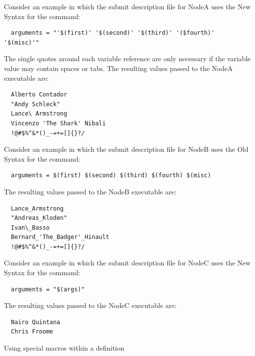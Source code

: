 Consider an example in which
the submit description file for NodeA uses the New Syntax for the
 command:
\footnotesize
\begin{verbatim}
  arguments = "'$(first)' '$(second)' '$(third)' '($fourth)' '$(misc)'"
\end{verbatim}
\normalsize
The single quotes around each variable reference are only necessary
if the variable value may contain spaces or tabs.
The resulting values passed to the NodeA executable are:
\footnotesize
\begin{verbatim}
  Alberto Contador
  "Andy	Schleck"
  Lance\ Armstrong
  Vincenzo 'The Shark' Nibali
  !@#$%^&*()_-=+=[]{}?/
\end{verbatim}
\normalsize

Consider an example in which
the submit description file for NodeB uses the Old Syntax for the
 command:
\footnotesize
\begin{verbatim}
  arguments = $(first) $(second) $(third) $(fourth) $(misc)
\end{verbatim}
\normalsize

The resulting values passed to the NodeB executable are:
\footnotesize
\begin{verbatim}
  Lance_Armstrong
  "Andreas_Kloden"
  Ivan\_Basso
  Bernard_'The_Badger'_Hinault
  !@#$%^&*()_-=+=[]{}?/
\end{verbatim}
\normalsize

Consider an example in which
the submit description file for NodeC uses the New Syntax for the
 command:
\footnotesize
\begin{verbatim}
  arguments = "$(args)"
\end{verbatim}
\normalsize

The resulting values passed to the NodeC executable are:
\footnotesize
\begin{verbatim}
  Nairo Quintana
  Chris Froome
\end{verbatim}
\normalsize

\begin{description}
\item[Using special macros within a definition]
\end{description}

